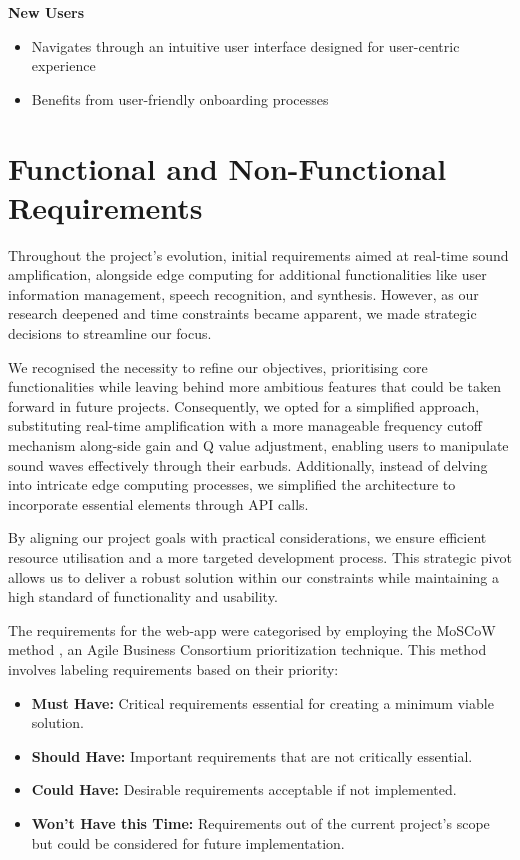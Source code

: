 \documentclass{l4proj}
\begin{document}
\textbf{New Users}
\begin{itemize}
    \item Navigates through an intuitive user interface designed for user-centric experience
    \item Benefits from user-friendly onboarding processes
\end{itemize}

\section{Functional and Non-Functional Requirements}
\label{sec:req}

Throughout the project's evolution, initial requirements aimed at real-time sound amplification, alongside edge computing for additional functionalities like user information management, speech recognition, and synthesis. However, as our research deepened and time constraints became apparent, we made strategic decisions to streamline our focus.

We recognised the necessity to refine our objectives, prioritising core functionalities while leaving behind more ambitious features that could be taken forward in future projects. Consequently, we opted for a simplified approach, substituting real-time amplification with a more manageable frequency cutoff mechanism along-side gain and Q value adjustment, enabling users to manipulate sound waves effectively through their earbuds. Additionally, instead of delving into intricate edge computing processes, we simplified the architecture to incorporate essential elements through API calls.

By aligning our project goals with practical considerations, we ensure efficient resource utilisation and a more targeted development process. This strategic pivot allows us to deliver a robust solution within our constraints while maintaining a high standard of functionality and usability.

The requirements for the web-app were categorised by employing the MoSCoW method \citep{Business}, an Agile Business Consortium prioritization technique. This method involves labeling requirements based on their priority:

\begin{itemize}
    \item \textbf{Must Have:} Critical requirements essential for creating a minimum viable solution.
    \item \textbf{Should Have:} Important requirements that are not critically essential.
    \item \textbf{Could Have:} Desirable requirements acceptable if not implemented.
    \item \textbf{Won’t Have this Time:} Requirements out of the current project's scope but could be considered for future implementation.
\end{itemize}
\end{document}
